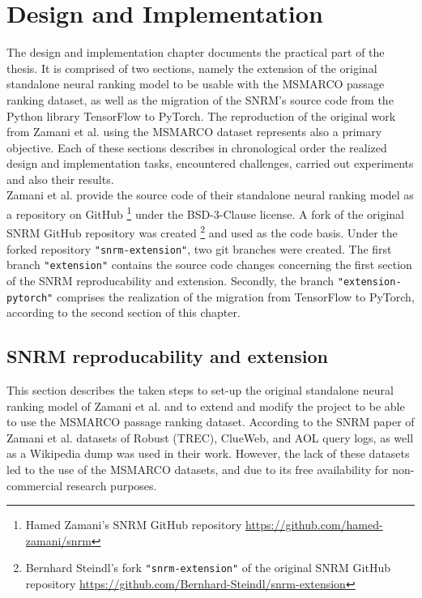 \chapter{Design and Implementation}

The design and implementation chapter documents the practical part of the thesis.
It is comprised of two sections, namely the extension of the original standalone neural
    ranking model to be usable with the MSMARCO passage ranking dataset,
    as well as the migration of the SNRM's source code from the Python library TensorFlow 
    to PyTorch.
The reproduction of the original work from 
    Zamani et al. \cite{zamani:2018:from-neural-reranking-to-neural-ranking}
    using the MSMARCO dataset represents also a primary objective.
Each of these sections describes in chronological order the realized
    design and implementation tasks, encountered challenges, 
    carried out experiments and also their results.\\
Zamani et al. provide the source code of their standalone neural ranking model as a
    repository on GitHub
    \footnote{Hamed Zamani's SNRM GitHub repository \url{https://github.com/hamed-zamani/snrm}}
    under the BSD-3-Clause license.
A fork of the original SNRM GitHub repository was created
    \footnote{Bernhard Steindl's fork \texttt{"snrm-extension"} of the original SNRM GitHub repository \url{https://github.com/Bernhard-Steindl/snrm-extension}}
    and used as the code basis.
Under the forked repository \texttt{"snrm-extension"}, two git branches were created.
The first branch \texttt{"extension"} contains the source code changes concerning the first
    section of the SNRM reproducability and extension.
Secondly, the branch \texttt{"extension-pytorch"} comprises the realization of the migration
    from TensorFlow to PyTorch, according to the second section of this chapter.


\section{SNRM reproducability and extension}
This section describes the taken steps to set-up the original standalone neural ranking model of Zamani et al.
    and to extend and modify the project to be able to use the MSMARCO passage ranking dataset.
According to the SNRM paper of Zamani et al. \cite{zamani:2018:from-neural-reranking-to-neural-ranking} 
    datasets of Robust (TREC), ClueWeb, and AOL query logs, as well as a Wikipedia dump was used
    in their work.
However, the lack of these datasets led to the use of the MSMARCO datasets, 
    and due to its free availability for non-commercial research purposes.

